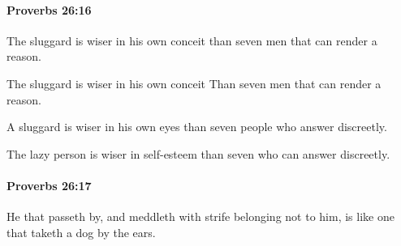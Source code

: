 		\paragraph{Proverbs 26:16} %
			\label{PROVERBS-26-16}

			The sluggard is wiser in his own conceit than seven men that can render a reason.

			\begin{versebox}
					\item[BHS] 
					\item[ASV] The sluggard is wiser in his own conceit Than seven men that can render a reason.
					\item[NIV] A sluggard is wiser in his own eyes than seven people who answer discreetly.
					\item[NRSV] The lazy person is wiser in self-esteem than seven who can answer discreetly.
			\end{versebox}

		\paragraph{Proverbs 26:17} %
			\label{PROVERBS-26-17}

			He that passeth by, and meddleth with strife belonging not to him, is like one that taketh a dog by the ears.

